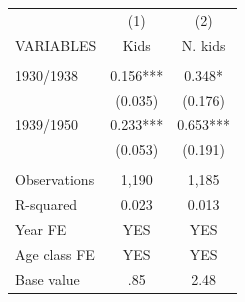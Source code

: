 \begin{tabular}{lcc} \hline
 & (1) & (2) \\
VARIABLES & Kids & N. kids \\ \hline
 &  &  \\
1930/1938 & 0.156*** & 0.348* \\
 & (0.035) & (0.176) \\
1939/1950 & 0.233*** & 0.653*** \\
 & (0.053) & (0.191) \\
 &  &  \\
Observations & 1,190 & 1,185 \\
R-squared & 0.023 & 0.013 \\
Year FE & YES & YES \\
Age class FE & YES & YES \\
 Base value & .85 & 2.48 \\ \hline
\end{tabular}
